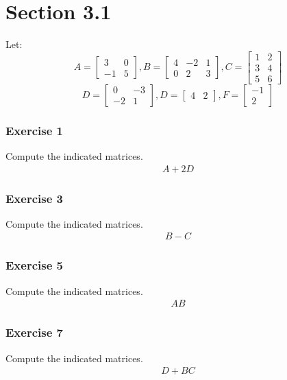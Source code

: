 \documentclass[letterpaper, 12pt]{math}
\begin{document}
\section*{Section 3.1}
Let:
\[ A = \begin{bmatrix}3 & 0 \\ -1 & 5\end{bmatrix},
  B = \begin{bmatrix}4 & -2 & 1 \\ 0 & 2 & 3\end{bmatrix},
  C = \begin{bmatrix}1 & 2 \\ 3 & 4 \\ 5 & 6\end{bmatrix} \]
\[ D = \begin{bmatrix}0 & -3 \\ -2 & 1\end{bmatrix},
  D = \begin{bmatrix}4 & 2\end{bmatrix},
  F = \begin{bmatrix}-1 \\ 2\end{bmatrix} \]

\subsubsection*{Exercise 1}
Compute the indicated matrices.
\begin{align*}
  A+2D
\end{align*}

\subsubsection*{Exercise 3}
Compute the indicated matrices.
\begin{align*}
  B-C
\end{align*}

\subsubsection*{Exercise 5}
Compute the indicated matrices.
\begin{align*}
  AB
\end{align*}

\subsubsection*{Exercise 7}
Compute the indicated matrices.
\begin{align*}
  D+BC
\end{align*}
\end{document}
